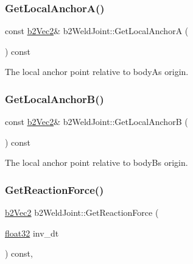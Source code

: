 \mbox{\label{classb2_weld_joint_af3a42eee31a74fe895b07fa694dc4ae5}} 
\subsubsection{\texorpdfstring{GetLocalAnchorA()}{GetLocalAnchorA()}}
{\footnotesize\ttfamily const \mbox{\hyperlink{structb2_vec2}{b2\+Vec2}}\& b2\+Weld\+Joint\+::\+Get\+Local\+AnchorA (\begin{DoxyParamCaption}{ }\end{DoxyParamCaption}) const\hspace{0.3cm}{\ttfamily [inline]}}



The local anchor point relative to bodyA\textquotesingle{}s origin. 

\mbox{\label{classb2_weld_joint_ac0c5e6a53b120f0302d2c6d267d40147}} 
\subsubsection{\texorpdfstring{GetLocalAnchorB()}{GetLocalAnchorB()}}
{\footnotesize\ttfamily const \mbox{\hyperlink{structb2_vec2}{b2\+Vec2}}\& b2\+Weld\+Joint\+::\+Get\+Local\+AnchorB (\begin{DoxyParamCaption}{ }\end{DoxyParamCaption}) const\hspace{0.3cm}{\ttfamily [inline]}}



The local anchor point relative to bodyB\textquotesingle{}s origin. 

\mbox{\label{classb2_weld_joint_ae5a6e89a36fc7fec7aae528ec2895308}} 
\subsubsection{\texorpdfstring{GetReactionForce()}{GetReactionForce()}}
{\footnotesize\ttfamily \mbox{\hyperlink{structb2_vec2}{b2\+Vec2}} b2\+Weld\+Joint\+::\+Get\+Reaction\+Force (\begin{DoxyParamCaption}\item[{\mbox{\hyperlink{b2_settings_8h_aacdc525d6f7bddb3ae95d5c311bd06a1}{float32}}}]{inv\+\_\+dt }\end{DoxyParamCaption}) const\hspace{0.3cm}{\ttfamily [override]}, {\ttfamily [virtual]}}



